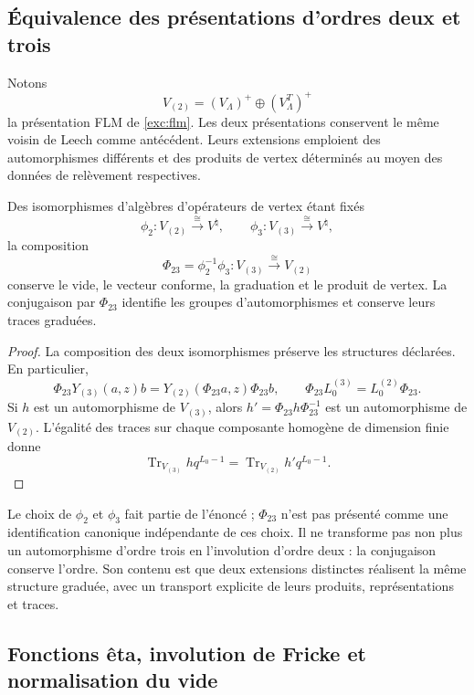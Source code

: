\subsection{Équivalence des présentations d'ordres deux et trois}
\label{km:equivalencia-dos-tres}

Notons
\[
 V_{(2)}=(V_\Lambda)^+\oplus(V_\Lambda^T)^+
\]
la présentation FLM de \eqref{exc:flm}. Les deux présentations conservent le même voisin de Leech comme antécédent. Leurs extensions emploient des automorphismes différents et des produits de vertex déterminés au moyen des données de relèvement respectives.

\begin{theorem}
\label{km:equivalencia-voa}
Des isomorphismes d'algèbres d'opérateurs de vertex étant fixés
\[
 \phi_2:V_{(2)}\xrightarrow{\ \cong\ }V^\natural,
 \qquad
 \phi_3:V_{(3)}\xrightarrow{\ \cong\ }V^\natural,
\]
la composition
\begin{equation}
 \Phi_{23}=\phi_2^{-1}\phi_3:
 V_{(3)}\xrightarrow{\ \cong\ }V_{(2)}
 \label{km:Phi23}
\end{equation}
conserve le vide, le vecteur conforme, la graduation et le produit de vertex. La conjugaison par \(\Phi_{23}\) identifie les groupes d'automorphismes et conserve leurs traces graduées.
\end{theorem}
\begin{proof}
La composition des deux isomorphismes préserve les structures
déclarées. En particulier,
\[
 \Phi_{23}Y_{(3)}(a,z)b
 =Y_{(2)}(\Phi_{23}a,z)\Phi_{23}b,
 \qquad
 \Phi_{23}L_0^{(3)}=L_0^{(2)}\Phi_{23}.
\]
Si \(h\) est un automorphisme de \(V_{(3)}\), alors
\(h' =\Phi_{23}h\Phi_{23}^{-1}\) est un automorphisme de
\(V_{(2)}\). L'égalité des traces sur chaque composante homogène
de dimension finie donne
\[
 \operatorname{Tr}_{V_{(3)}}h q^{L_0-1}
 =\operatorname{Tr}_{V_{(2)}}h' q^{L_0-1}.
\]
\end{proof}

Le choix de \(\phi_2\) et \(\phi_3\) fait partie de l'énoncé ;
\(\Phi_{23}\) n'est pas présenté comme une identification canonique
indépendante de ces choix. Il ne transforme pas non plus un automorphisme
d'ordre trois en l'involution d'ordre deux : la conjugaison conserve
l'ordre. Son contenu est que deux extensions distinctes réalisent la
même structure graduée, avec un transport explicite de leurs produits,
représentations et traces.

\subsection{Fonctions êta, involution de Fricke et normalisation du vide}
\label{km:fricke}

